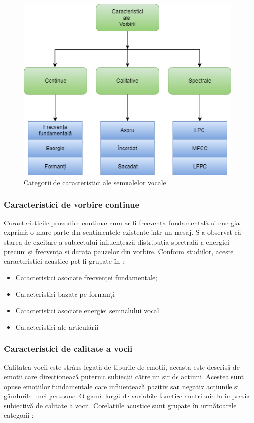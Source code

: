\documentclass[9pt,shortpaper,twoside,web]{ieeecolor}
\begin{document}
\begin{figure}[htb]
\includegraphics[width=0.9\columnwidth]{res/fig/clasificare-caracteristicilor}
\caption{Categorii de caracteristici ale semnalelor vocale}
\label{fig2}
\end{figure}

\subsubsection{Caracteristici de vorbire continue}
Caracteristicile prozodice continue cum ar fi frecvența fundamentală și energia exprimă o mare parte din sentimentele existente într-un mesaj. S-a observat că starea de excitare a subiectului influențează distribuția spectrală a energiei precum și frecvența și durata pauzelor din vorbire. Conform studiilor, aceste caracteristici acustice pot fi grupate în \cite{b1}:

\begin{itemize}
\item Caracteristici asociate frecvenței fundamentale;

\item Caracteristici bazate pe formanți

\item Caracteristici asociate energiei semnalului vocal

\item Caracteristici ale articulării
\end{itemize}


\subsubsection{Caracteristici de calitate a vocii}
Calitatea vocii este strâns legată de tipurile de emoții, aceasta este descrisă de emoții care direcționează puternic subiecții către un șir de acțiuni. Acestea sunt opuse emoțiilor fundamentale care influențează pozitiv sau negativ acțiunile și gândurile unei persoane. O gamă largă de variabile fonetice contribuie la impresia subiectivă de calitate a vocii. Corelațiile acustice sunt grupate în următoarele categorii \cite{b1}:
\end{document}
